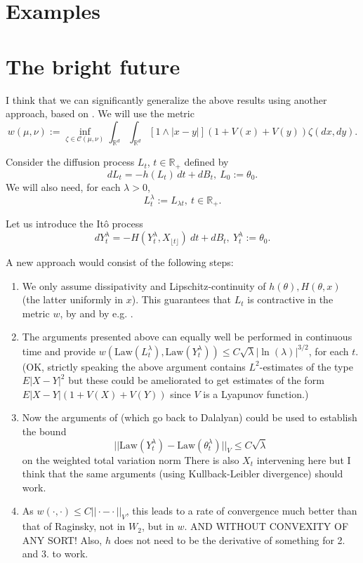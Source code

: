 \documentclass[a4paper,draft]{article}
\begin{document}
\section{Examples}\label{examples}

\section{The bright future}

I think that we can significantly generalize the above results using another approach, based on 
\cite{eberle}. We will use the metric
$$
w(\mu,\nu):=\inf_{\zeta\in\mathcal{C}(\mu,\nu)}\int_{\mathbb{R}^d}\int_{\mathbb{R}^d} [1\wedge |x-y|](1+V(x)+V(y))\zeta(dx,dy).
$$

Consider the diffusion process $L_t$, $t\in\mathbb{R}_+$ defined by
$$
dL_t=-h(L_t)\, dt+ dB_t,\ L_0:=\theta_0.
$$
We will also need, for each $\lambda>0$,
$$
L^{\lambda}_t:=L_{\lambda t},\ t\in\mathbb{R}_+.
$$

Let us introduce the It\^{o} process
$$
dY^{\lambda}_t=-H(Y^{\lambda}_t,X_{\lfloor t\rfloor})\ dt+dB_t,\ Y^{\lambda}_t:=\theta_0.
$$

A new approach would consist of the following steps:

\begin{enumerate}

\item We only assume dissipativity and Lipschitz-continuity of $h(\theta),H(\theta,x)$ (the latter uniformly in $x$). 
This guarantees that $L_t$ is contractive in the metric $w$, by \cite{eberle} and by e.g. \cite{unadjusted}.

\item The arguments presented above can equally well be performed in continuous time and
provide $w(\mathrm{Law}(L^{\lambda}_t),\mathrm{Law}(Y^{\lambda}_t))\leq C\sqrt{\lambda}|\ln(\lambda)|^{3/2}$,
for each $t$. (OK, strictly speaking the above argument contains $L^2$-estimates of the type $E|X-Y|^2$ but these
could be ameliorated to get estimates of the form $E|X-Y|(1+V(X)+V(Y))$ since $V$ is a Lyapunov function.)

\item Now the arguments of \cite{unadjusted} (which go back to Dalalyan) could be used to establish
the bound
$$
||\mathrm{Law}(Y^{\lambda}_t)-\mathrm{Law}(\theta^{\lambda}_t)||_{V}\leq C\sqrt{\lambda}
$$
on the weighted total variation norm
There is also $X_t$ intervening here but I think that the same arguments (using Kullback-Leibler
divergence) should work.

\item As $w(\cdot,\cdot)\leq C||\cdot-\cdot||_{V}$, this leads to a rate of convergence much better than
that of Raginsky, not in $W_2$, but in $w$. AND WITHOUT CONVEXITY OF ANY SORT! Also, $h$ does not need to
be the derivative of something for 2. and 3. to work. 

\end{enumerate}
\end{document}
